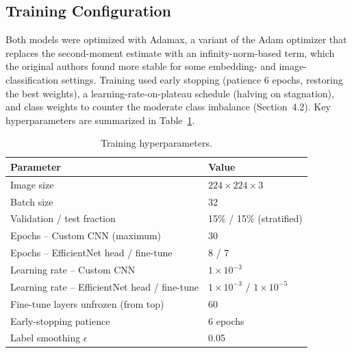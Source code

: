 \documentclass[12pt,a4paper]{article}
\begin{document}
\subsection{Training Configuration}
Both models were optimized with Adamax, a variant of the Adam optimizer
\cite{kingma2015adam} that replaces the second-moment estimate with an
infinity-norm-based term, which the original authors found more stable for
some embedding- and image-classification settings. Training used early
stopping (patience 6 epochs, restoring the best weights), a
learning-rate-on-plateau schedule (halving on stagnation), and class weights
to counter the moderate class imbalance (Section~4.2). Key hyperparameters
are summarized in Table~\ref{tab:hyperparams}.

\begin{table}[H]
\centering
\caption{Training hyperparameters.}
\begin{tabular}{@{}ll@{}}
\toprule
\textbf{Parameter} & \textbf{Value} \\
\midrule
Image size & $224\times224\times3$ \\
Batch size & 32 \\
Validation / test fraction & 15\% / 15\% (stratified) \\
Epochs -- Custom CNN (maximum) & 30 \\
Epochs -- EfficientNet head / fine-tune & 8 / 7 \\
Learning rate -- Custom CNN & $1\times10^{-3}$ \\
Learning rate -- EfficientNet head / fine-tune & $1\times10^{-3}$ / $1\times10^{-5}$ \\
Fine-tune layers unfrozen (from top) & 60 \\
Early-stopping patience & 6 epochs \\
Label smoothing $\epsilon$ & 0.05 \\
\bottomrule
\end{tabular}
\label{tab:hyperparams}
\end{table}
\end{document}
